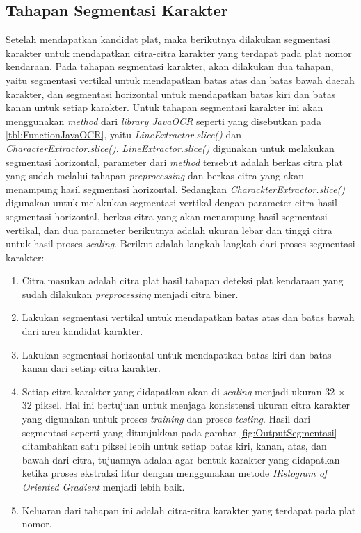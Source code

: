 \subsection{Tahapan Segmentasi Karakter}
\noindent Setelah mendapatkan kandidat plat, maka berikutnya dilakukan segmentasi karakter untuk mendapatkan citra-citra karakter yang terdapat pada plat nomor kendaraan. Pada tahapan segmentasi karakter, akan dilakukan dua tahapan, yaitu segmentasi vertikal untuk mendapatkan batas atas dan batas bawah daerah karakter, dan segmentasi horizontal untuk mendapatkan batas kiri dan batas kanan untuk setiap karakter. Untuk tahapan segmentasi karakter ini akan menggunakan \textit{method} dari \textit{library JavaOCR} seperti yang disebutkan pada \ref{tbl:FunctionJavaOCR}, yaitu \textit{LineExtractor.slice()} dan \textit{CharacterExtractor.slice()}. \textit{LineExtractor.slice()} digunakan untuk melakukan segmentasi horizontal, parameter dari \textit{method} tersebut adalah berkas citra plat yang sudah melalui tahapan \textit{preprocessing} dan berkas citra yang akan menampung hasil segmentasi horizontal. Sedangkan \textit{CharackterExtractor.slice()} digunakan untuk melakukan segmentasi vertikal dengan parameter citra hasil segmentasi horizontal, berkas citra yang akan menampung hasil segmentasi vertikal, dan dua parameter berikutnya adalah ukuran lebar dan tinggi citra untuk hasil proses \textit{scaling}. Berikut adalah langkah-langkah dari proses segmentasi karakter:
\begin{enumerate}
\item Citra masukan adalah citra plat hasil tahapan deteksi plat kendaraan yang sudah dilakukan \textit{preprocessing} menjadi citra biner.
\item Lakukan segmentasi vertikal untuk mendapatkan batas atas dan batas bawah dari area kandidat karakter.
\item Lakukan segmentasi horizontal untuk mendapatkan batas kiri dan batas kanan dari setiap citra karakter.
\item Setiap citra karakter yang didapatkan akan di-\textit{scaling} menjadi ukuran 32 $\times$ 32 piksel. Hal ini bertujuan untuk menjaga konsistensi ukuran citra karakter yang digunakan untuk proses \textit{training} dan proses \textit{testing}. Hasil dari segmentasi seperti yang ditunjukkan pada gambar \ref{fig:OutputSegmentasi} ditambahkan satu piksel lebih untuk setiap batas kiri, kanan, atas, dan bawah dari citra, tujuannya adalah agar bentuk karakter yang didapatkan ketika proses ekstraksi fitur dengan menggunakan metode \textit{Histogram of Oriented Gradient} menjadi lebih baik.
\item Keluaran dari tahapan ini adalah citra-citra karakter yang terdapat pada plat nomor.
\end{enumerate}

